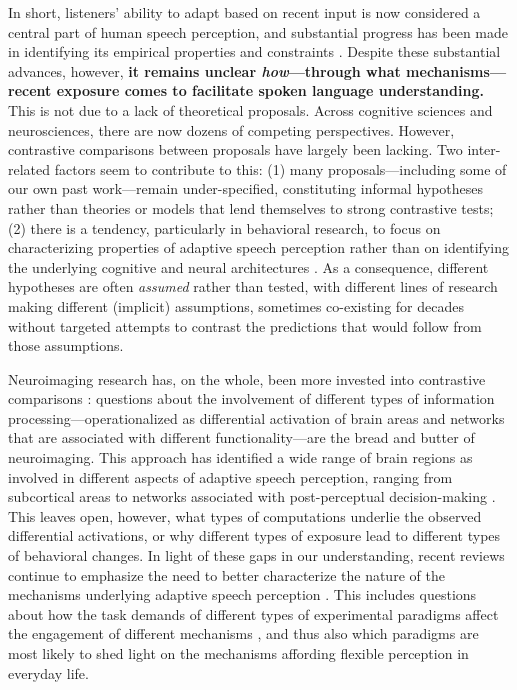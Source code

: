 \documentclass[
  11pt,
  man,floatsintext]{apa6}
\begin{document}
In short, listeners' ability to adapt based on recent input is now considered a central part of human speech perception, and substantial progress has been made in identifying its empirical properties and constraints \autocites[for comprehensive reviews, see][]{baeseberk2020,johnson-sjerps2021,tzeng2021,quam-creel2021,stilp2020}. Despite these substantial advances, however, \textbf{it remains unclear \emph{how}---through what mechanisms---recent exposure comes to facilitate spoken language understanding.} This is not due to a lack of theoretical proposals. Across cognitive sciences and neurosciences, there are now dozens of competing perspectives. However, contrastive comparisons between proposals have largely been lacking. Two inter-related factors seem to contribute to this: (1) many proposals---including some of our own past work---remain under-specified, constituting informal hypotheses rather than theories or models that lend themselves to strong contrastive tests; (2) there is a tendency, particularly in behavioral research, to focus on characterizing properties of adaptive speech perception rather than on identifying the underlying cognitive and neural architectures \autocites[but see][]{apfelbaum-mcmurray2015,chodroff-wilson2020,harmon2019,hoffmanbion-escudero2007,kleinschmidt-jaeger2015,kiefte-nearey2019,lehet-holt2020,mcmurray-jongman2011,xie2021cognition}. As a consequence, different hypotheses are often \emph{assumed} rather than tested, with different lines of research making different (implicit) assumptions, sometimes co-existing for decades without targeted attempts to contrast the predictions that would follow from those assumptions.

Neuroimaging research has, on the whole, been more invested into contrastive comparisons \autocites[e.g.,][]{bonte2017,erb2013brain,guediche2015evidence,myers-mesite2014}: questions about the involvement of different types of information processing---operationalized as differential activation of brain areas and networks that are associated with different functionality---are the bread and butter of neuroimaging. This approach has identified a wide range of brain regions as involved in different aspects of adaptive speech perception, ranging from subcortical areas \autocites[e.g.,][]{skoe2021auditory,guediche2015evidence} to networks associated with post-perceptual decision-making \autocites[e.g.,][]{blanco-elorriera2021,myers-mesite2014,erb2013brain}. This leaves open, however, what types of computations underlie the observed differential activations, or why different types of exposure lead to different types of behavioral changes. In light of these gaps in our understanding, recent reviews continue to emphasize the need to better characterize the nature of the mechanisms underlying adaptive speech perception \autocites[from, e.g.,][]{samuel-kraljic2009}[to][]{weatherholtz-jaeger2016}[to][]{baeseberk2020}. This includes questions about how the task demands of different types of experimental paradigms affect the engagement of different mechanisms \autocite{baeseberk2018,zheng-samuel2020}, and thus also which paradigms are most likely to shed light on the mechanisms affording flexible perception in everyday life.
\end{document}
